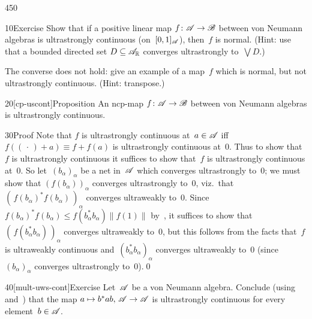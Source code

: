 \begin{parsec}{450}%
\begin{point}{10}{Exercise}%
Show that if a positive linear map $f\colon \mathscr{A}\to\mathscr{B}$
between von Neumann algebras 
is ultrastrongly continuous (on~$[0,1]_{\mathscr{A}}$), 
then~$f$ is normal.
(Hint: use that a bounded directed set 
$D\subseteq \mathscr{A}_{\mathbb{R}}$ converges ultrastrongly to~$\bigvee D$.)

The converse does not hold: give an example of a map~$f$ 
which is normal, but 
not ultrastrongly continuous. (Hint: transpose.)
\end{point}
\begin{point}{20}[cp-uscont]{Proposition}%
An ncp-map $f\colon \mathscr{A}\to\mathscr{B}$
between von Neumann algebras is 
ultrastrongly continuous.
\begin{point}{30}{Proof}%
Note that $f$ is ultrastrongly continuous at~$a\in\mathscr{A}$
iff $f((\,\cdot\,)+a)\equiv f + f(a)$ is ultrastrongly continuous at~$0$.
Thus to show that~$f$
is ultrastrongly continuous
it suffices to show that~$f$ is ultrastrongly continuous at~$0$.
So let~$(b_\alpha)_\alpha$ be a net in~$\mathscr{A}$
which converges ultrastrongly to~$0$;
we must show that $(f(b_\alpha))_\alpha$
converges ultrastrongly to~$0$, viz.~that
$(\,f(b_\alpha)^*f(b_\alpha)\,)_\alpha$ converges ultraweakly to~$0$.
Since
$f(b_\alpha)^*f(b_\alpha) \leq f(b_\alpha^*b_\alpha) \|f(1)\|$
by~, 
it suffices to show that~$(\,f(b_\alpha^*b_\alpha)\,)_\alpha$
converges ultraweakly to~$0$,
but this follows from the
facts that~$f$ is ultraweakly continuous
and~$(b_\alpha^*b_\alpha)_\alpha$
converges ultraweakly to~$0$
(since~$(b_\alpha)_\alpha$ converges ultrastrongly to~$0$).\qed
\end{point}
\end{point}
\begin{point}{40}[mult-uws-cont]{Exercise}%
Let~$\mathscr{A}$ be a von Neumann algebra.
Conclude (using~ and~)
that the map $a\mapsto b^*ab,\,\mathscr{A}\to\mathscr{A}$
is ultrastrongly continuous for every
 element~$b\in\mathscr{A}$.


\end{point}
\end{parsec}

